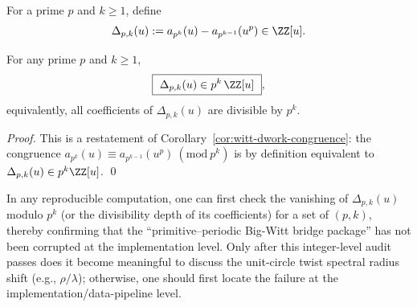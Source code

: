 \begin{definition}\label{def:witt-frobenius-defect}
For a prime \(p\) and \(k\ge 1\), define
\[
\Delta_{p,k}(u):=a_{p^k}(u)-a_{p^{k-1}}(u^p)\in\ZZ[u].
\]
\end{definition}

\begin{proposition}\label{prop:witt-frobenius-defect-divisibility}
For any prime \(p\) and \(k\ge 1\),
\[
\boxed{\ \Delta_{p,k}(u)\in p^k\,\ZZ[u]\ },
\]
equivalently, all coefficients of \(\Delta_{p,k}(u)\) are divisible by \(p^k\).
\end{proposition}
\begin{proof}
This is a restatement of Corollary~\ref{cor:witt-dwork-congruence}: the congruence
\(
a_{p^k}(u)\equiv a_{p^{k-1}}(u^p)\ (\mathrm{mod}\ p^k)
\)
is by definition equivalent to \(\Delta_{p,k}(u)\in p^k\ZZ[u]\). \qed
\end{proof}

\begin{remark}\label{rem:witt-frobenius-defect-audit}
In any reproducible computation, one can first check the vanishing of \(\Delta_{p,k}(u)\) modulo \(p^k\) (or the divisibility depth of its coefficients) for a set of \((p,k)\), thereby confirming that the ``primitive--periodic Big-Witt bridge package'' has not been corrupted at the implementation level.
Only after this integer-level audit passes does it become meaningful to discuss the unit-circle twist spectral radius shift (e.g., \(\rho/\lambda\)); otherwise, one should first locate the failure at the implementation/data-pipeline level.
\end{remark}
